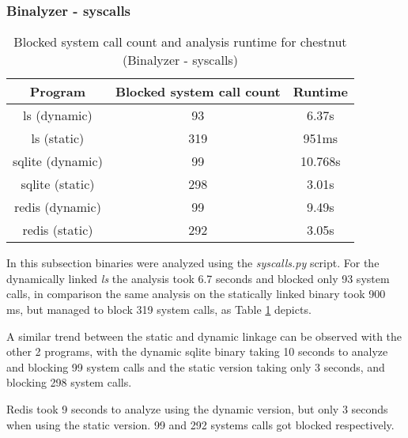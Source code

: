 \subsubsection {Binalyzer - syscalls}
\begin{table}[!h]
\begin{center}
\caption{Blocked system call count and analysis runtime for chestnut (Binalyzer - syscalls)}
\label{tbl:chestnut_bin_sys_results}
\begin{tabular}{||c c c||} 
 \hline
 Program & Blocked system call count & Runtime \\
 \hline\hline
 ls (dynamic) & 93 & 6.37s \\ 
 \hline
 ls (static) & 319 & 951ms \\ 
 \hline
 sqlite (dynamic) & 99 & 10.768s \\ 
 \hline
 sqlite (static) & 298 & 3.01s \\ 
 \hline
 redis (dynamic) & 99 & 9.49s \\ 
 \hline
 redis (static) & 292 & 3.05s \\ 
 \hline
\end{tabular}
\end{center}
\end{table}
In this subsection binaries were analyzed using the \textit{syscalls.py} script.
For the dynamically linked \textit{ls} the analysis took 6.7 seconds and blocked only 93 system calls, in comparison the same analysis on the statically linked binary took 900 ms, but managed to block 319 system calls, as Table \ref{tbl:chestnut_bin_sys_results} depicts.

A similar trend between the static and dynamic linkage can be observed with the other 2 programs, with the dynamic sqlite binary taking 10 seconds to analyze and blocking 99 system calls and the static version taking only 3 seconds, and blocking 298 system calls.

Redis took 9 seconds to analyze using the dynamic version, but only 3 seconds when using the static version. 99 and 292 systems calls got blocked respectively.

